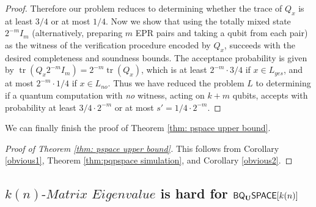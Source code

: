 \documentclass[11pt]{article}
\newtheorem{corollary}[theorem]{Corollary}
\theoremstyle{definition}
\theoremstyle{remark}
\newcommand\spechamiltonian[1]{#1\textit{-Matrix Eigenvalue}}
\newcommand{\classfont}{\sf}
\newcommand{\Unitary}{\mathbf{U}}
\newcommand{\unitaryQSPACE}[3]{{\classfont{Q}_\Unitary\classfont{SPACE}}[#1](#2,#3)}
\newcommand{\unitaryBQSPACE}[1]{{\classfont{BQ}_\Unitary\classfont{SPACE}}[#1]}
\DeclareMathOperator{\tr}{tr}
\begin{document}
\begin{proof}
Therefore our problem reduces to determining whether the trace of $Q_x$ is at least $3/4$ or at most $1/4$.  Now we show that using the totally mixed state $2^{-m}I_m$ (alternatively, preparing $m$ EPR pairs and taking a qubit from each pair) as the witness of the verification procedure encoded by $Q_x$, succeeds with the desired completeness and soundness bounds.  The acceptance probability is given by
$\tr(Q_x 2^{-m}I_m) = 2^{-m} \tr(Q_x)$,
which is at least $2^{-m} \cdot 3/4$ if $x\in L_{yes}$, and at most $2^{-m} \cdot 1/4$ if $x\in L_{no}$. Thus we have reduced the problem $L$ to determining if a quantum computation with \emph{no} witness, acting on $k+m$ qubits, accepts with probability at least $3/4 \cdot 2^{-m}$ or at most $s'=1/4 \cdot 2^{-m}$.
\end{proof}
We can finally finish the proof of Theorem \ref{thm: pspace upper bound}.
\begin{proof}[Proof of Theorem \ref{thm: pspace upper bound}]
This follows from Corollary \ref{obvious1}, Theorem \ref{thm:pqpspace simulation}, and Corollary \ref{obvious2}.
\end{proof}

%

\subsection{$\spechamiltonian{k(n)}$ is hard for $\unitaryBQSPACE{k(n)}$} \label{sec: specham-hardness}
\end{document}
